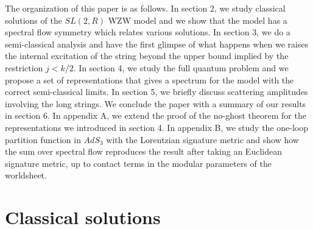 \medskip

The organization of this paper is as follows. 
In section 2, we study classical solutions of the $SL(2,R)$ WZW model
and we show that the model has a spectral flow symmetry which relates
various solutions. In section 3, we do a semi-classical analysis
and have the first glimpse of what happens when we raises the internal 
excitation of the string beyond the upper bound implied by the restriction 
$j<k/2$. In 
section 4, we study the full quantum problem and we propose a set 
of representations that gives a spectrum for the model with the
correct semi-classical limits. In section 5, 
we briefly discuss scattering amplitudes involving 
the long strings. We conclude the paper with a summary
of our results in section 6. 
In appendix A, we extend the proof of the no-ghost theorem
for the representations we introduced in section 4. In appendix B, 
we study the one-loop partition function in $AdS_3$ with the
Lorentzian signature metric and
show how the sum over spectral flow reproduces the result
\cite{Gawedzki:1991yu} after taking an  Euclidean signature metric, 
up to contact terms in the modular parameters
of the worldsheet. 



\section{Classical solutions}
\label{class}


